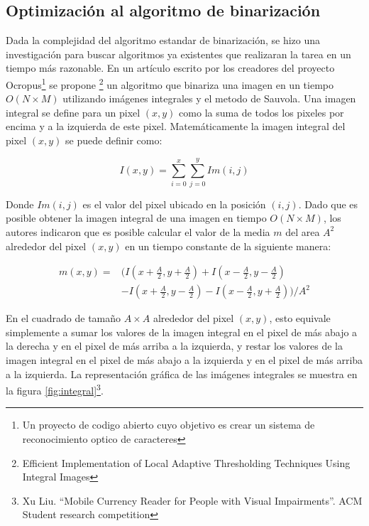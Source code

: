 \documentclass[a4paper, 11pt, oneside]{report}
\begin{document}
\subsection{Optimización al algoritmo de binarización}

Dada la complejidad del algoritmo estandar de binarización, se hizo una investigación para buscar algoritmos ya existentes que realizaran la tarea en un tiempo más razonable. En un artículo escrito por los creadores del proyecto Ocropus\footnote{Un proyecto de codigo abierto cuyo objetivo es crear un sistema de reconocimiento optico de caracteres} se propone \footnote{Efficient Implementation of Local Adaptive Thresholding Techniques Using Integral Images} un algoritmo que binariza una imagen en un tiempo $O(N \times M)$ utilizando imágenes integrales y el metodo de Sauvola. Una imagen integral se define para un pixel $(x, y)$ como la suma de todos los pixeles por encima y a la izquierda de este pixel. Matemáticamente la imagen integral del pixel $(x, y)$ se puede definir como:

\begin{equation}
	I(x, y) = \sum_{i=0}^{x}\sum_{j=0}^{y}Im(i, j)
\end{equation}

Donde $Im(i, j)$ es el valor del pixel ubicado en la posición $(i, j)$. Dado que es posible obtener la imagen integral de una imagen en tiempo $O(N \times M)$, los autores indicaron que es posible calcular el valor de la media $m$ del area $A^{2}$ alrededor del pixel $(x, y)$ en un tiempo constante de la siguiente manera:

\begin{align*}
  m(x, y) =& (I(x + \frac{A}{2}, y + \frac{A}{2}) + I(x - \frac{A}{2}, y - \frac{A}{2}) \\
	   &- I(x + \frac{A}{2}, y - \frac{A}{2}) - I(x - \frac{A}{2}, y + \frac{A}{2})) / A^{2}
\end{align*}

En el cuadrado de tamaño $A \times A$ alrededor del pixel $(x, y)$, esto equivale simplemente a sumar los valores de la imagen integral en el pixel de más abajo a la derecha y en el pixel de más arriba a la izquierda, y restar los valores de la imagen integral en el pixel de más abajo a la izquierda y en el pixel de más arriba a la izquierda. La representación gráfica de las imágenes integrales se muestra en la figura \ref{fig:integral}\footnote{Xu Liu. ``Mobile Currency Reader for People with Visual Impairments''. ACM Student research competition}.
\end{document}
